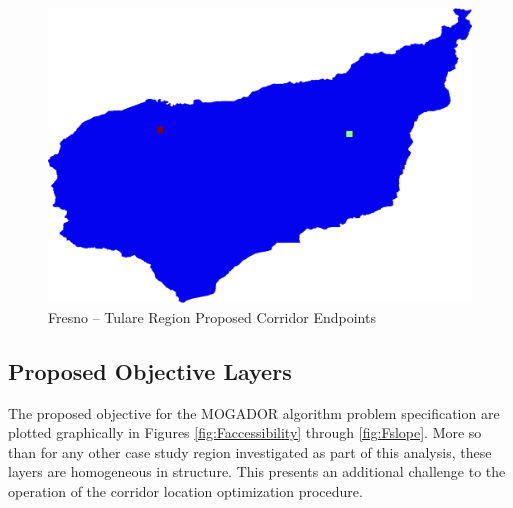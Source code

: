         \begin{figure}[!h]
            \begin{center}
            \includegraphics[width=5.5in]{figures/Fresno_Endpoints.png}   
            \caption{Fresno -- Tulare Region Proposed Corridor Endpoints}
            \label{fig:Fendpoints}
            \end{center}
        \end{figure}

    \subsection{Proposed Objective Layers}
    
The proposed objective for the MOGADOR algorithm problem specification are plotted graphically in Figures \ref{fig:Faccessibility} through \ref{fig:Fslope}. More so than for any other case study region investigated as part of this analysis, these layers are homogeneous in structure. This presents an additional challenge to the operation of the corridor location optimization procedure. 
    
